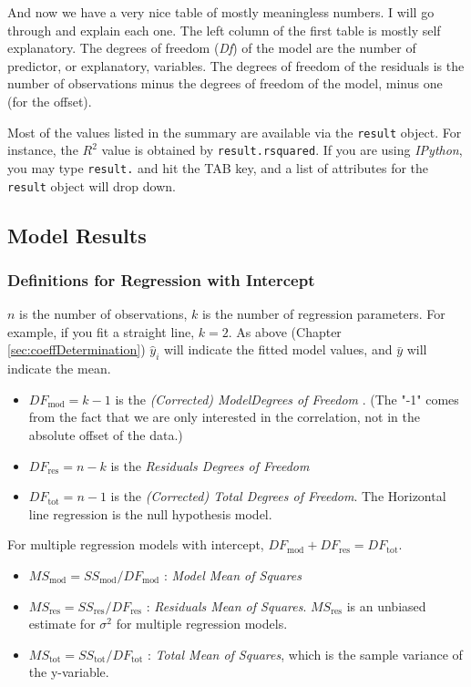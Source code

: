 And now we have a very nice table of mostly meaningless numbers. I will go through and explain each one. The left column of the first table is mostly self explanatory. The degrees of freedom (\emph{Df}) of the model are the number of predictor, or explanatory, variables. The degrees of freedom of the residuals is the number of observations minus the degrees of freedom of the model, minus one (for the offset).

Most of the values listed in the summary are available via the \texttt{result} object. For instance, the $R^2$ value is obtained by \lstinline{result.rsquared}. If you are using \emph{IPython}, you may type \lstinline{result.} and hit the TAB key, and a list of attributes for the \lstinline{result} object will drop down.

\subsection{Model Results}
\subsubsection{Definitions for Regression with Intercept}

$n$ is the number of observations, $k$ is the number of regression parameters. For example, if you fit a straight line, $k=2$.
As above (Chapter \ref{sec:coeffDetermination}) $\hat{y}_i$ will indicate the fitted model values, and $\bar{y}$ will indicate the mean.

\begin{itemize}
  \item $DF_\text{mod} = k - 1$ is the \emph{(Corrected) ModelDegrees of Freedom }. (The "-1" comes from the fact that we are only interested in the correlation, not in the absolute offset of the data.)
  \item $DF_\text{res} = n - k$ is the \emph{Residuals Degrees of Freedom}
  \item $DF_\text{tot} = n - 1$ is the \emph{(Corrected) Total Degrees of Freedom}. The Horizontal line regression is the null hypothesis model.
\end{itemize}

For multiple regression models with intercept, $DF_\text{mod} + DF_\text{res} = DF_\text{tot}$.

\begin{itemize}
  \item $MS_\text{mod} = SS_\text{mod} / DF_\text{mod}$ : \emph{Model Mean of Squares}
  \item $MS_\text{res} = SS_\text{res} / DF_\text{res}$ : \emph{Residuals Mean of Squares}. $MS_\text{res}$ is an unbiased estimate for $\sigma^2$ for multiple regression models.
  \item $MS_\text{tot} = SS_\text{tot} / DF_\text{tot}$ : \emph{Total Mean of Squares}, which is the sample variance of the y-variable.
\end{itemize}

